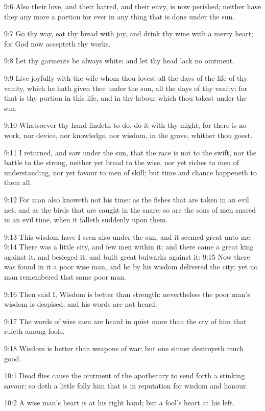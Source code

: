 9:6 Also their love, and their hatred, and their envy, is now perished; neither have they any more a portion for ever in any thing that is done under the sun.

9:7 Go thy way, eat thy bread with joy, and drink thy wine with a merry heart; for God now accepteth thy works.

9:8 Let thy garments be always white; and let thy head lack no ointment.

9:9 Live joyfully with the wife whom thou lovest all the days of the life of thy vanity, which he hath given thee under the sun, all the days of thy vanity: for that is thy portion in this life, and in thy labour which thou takest under the sun.

9:10 Whatsoever thy hand findeth to do, do it with thy might; for there is no work, nor device, nor knowledge, nor wisdom, in the grave, whither thou goest.

9:11 I returned, and saw under the sun, that the race is not to the swift, nor the battle to the strong, neither yet bread to the wise, nor yet riches to men of understanding, nor yet favour to men of skill; but time and chance happeneth to them all.

9:12 For man also knoweth not his time: as the fishes that are taken in an evil net, and as the birds that are caught in the snare; so are the sons of men snared in an evil time, when it falleth suddenly upon them.

9:13 This wisdom have I seen also under the sun, and it seemed great unto me: 9:14 There was a little city, and few men within it; and there came a great king against it, and besieged it, and built great bulwarks against it: 9:15 Now there was found in it a poor wise man, and he by his wisdom delivered the city; yet no man remembered that same poor man.

9:16 Then said I, Wisdom is better than strength: nevertheless the poor man's wisdom is despised, and his words are not heard.

9:17 The words of wise men are heard in quiet more than the cry of him that ruleth among fools.

9:18 Wisdom is better than weapons of war: but one sinner destroyeth much good.

10:1 Dead flies cause the ointment of the apothecary to send forth a stinking savour: so doth a little folly him that is in reputation for wisdom and honour.

10:2 A wise man's heart is at his right hand; but a fool's heart at his left.

